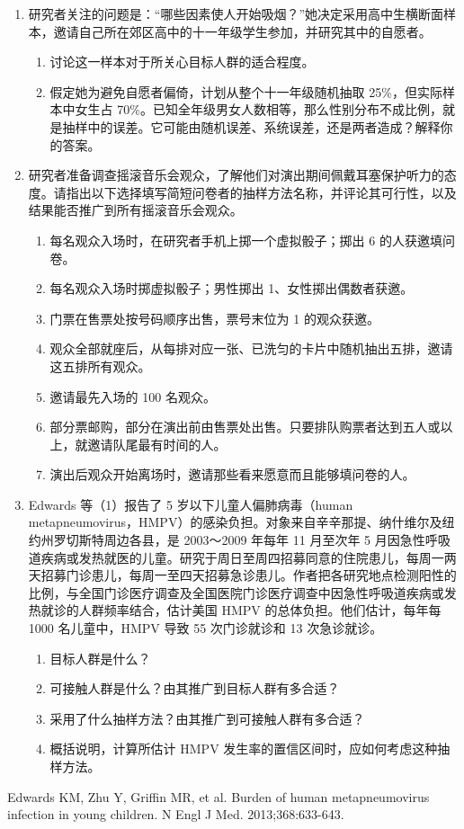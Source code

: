 \begin{enumerate}
\item 研究者关注的问题是：“哪些因素使人开始吸烟？”她决定采用高中生横断面样本，邀请自己所在郊区高中的十一年级学生参加，并研究其中的自愿者。
\begin{enumerate}
\item 讨论这一样本对于所关心目标人群的适合程度。
\item 假定她为避免自愿者偏倚，计划从整个十一年级随机抽取 25\%，但实际样本中女生占 70\%。已知全年级男女人数相等，那么性别分布不成比例，就是抽样中的误差。它可能由随机误差、系统误差，还是两者造成？解释你的答案。
\end{enumerate}
\item 研究者准备调查摇滚音乐会观众，了解他们对演出期间佩戴耳塞保护听力的态度。请指出以下选择填写简短问卷者的抽样方法名称，并评论其可行性，以及结果能否推广到所有摇滚音乐会观众。
\begin{enumerate}
\item 每名观众入场时，在研究者手机上掷一个虚拟骰子；掷出 6 的人获邀填问卷。
\item 每名观众入场时掷虚拟骰子；男性掷出 1、女性掷出偶数者获邀。
\item 门票在售票处按号码顺序出售，票号末位为 1 的观众获邀。
\item 观众全部就座后，从每排对应一张、已洗匀的卡片中随机抽出五排，邀请这五排所有观众。
\item 邀请最先入场的 100 名观众。
\item 部分票邮购，部分在演出前由售票处出售。只要排队购票者达到五人或以上，就邀请队尾最有时间的人。
\item 演出后观众开始离场时，邀请那些看来愿意而且能够填问卷的人。
\end{enumerate}
\item Edwards 等（1）报告了 5 岁以下儿童人偏肺病毒（human metapneumovirus，HMPV）的感染负担。对象来自辛辛那提、纳什维尔及纽约州罗切斯特周边各县，是 2003～2009 年每年 11 月至次年 5 月因急性呼吸道疾病或发热就医的儿童。研究于周日至周四招募同意的住院患儿，每周一两天招募门诊患儿，每周一至四天招募急诊患儿。作者把各研究地点检测阳性的比例，与全国门诊医疗调查及全国医院门诊医疗调查中因急性呼吸道疾病或发热就诊的人群频率结合，估计美国 HMPV 的总体负担。他们估计，每年每 1000 名儿童中，HMPV 导致 55 次门诊就诊和 13 次急诊就诊。
\begin{enumerate}
\item 目标人群是什么？
\item 可接触人群是什么？由其推广到目标人群有多合适？
\item 采用了什么抽样方法？由其推广到可接触人群有多合适？
\item 概括说明，计算所估计 HMPV 发生率的置信区间时，应如何考虑这种抽样方法。
\end{enumerate}
\end{enumerate}
\begin{references}
\item Edwards KM, Zhu Y, Griffin MR, et al. Burden of human metapneumovirus infection in young children. N Engl J Med. 2013;368:633-643.
\end{references}
